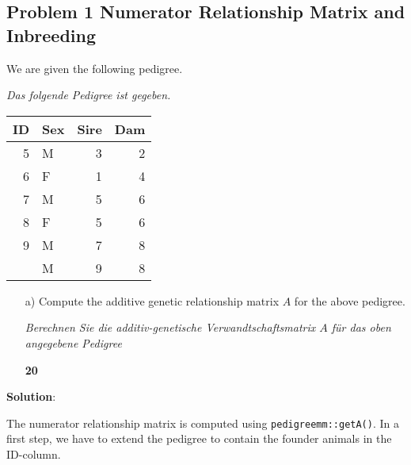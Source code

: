 \documentclass[
]{article}
\newcommand{\points}[1]
{\begin{flushright}\textbf{#1}\end{flushright}}
\newcommand{\solstart}
{\vspace{3ex}\textbf{Solution}:}
\begin{document}
\clearpage
\pagebreak

\hypertarget{problem-1-numerator-relationship-matrix-and-inbreeding}{%
\subsection{Problem 1 Numerator Relationship Matrix and
Inbreeding}\label{problem-1-numerator-relationship-matrix-and-inbreeding}}

We are given the following pedigree.

\textit{Das folgende Pedigree ist gegeben.}

\begin{center}

\begin{tabular}{rlrr}
\toprule
ID & Sex & Sire & Dam\\
\midrule
5 & M & 3 & 2\\
6 & F & 1 & 4\\
7 & M & 5 & 6\\
8 & F & 5 & 6\\
9 & M & 7 & 8\\
\addlinespace
10 & M & 9 & 8\\
\bottomrule
\end{tabular}
\end{center}

\begin{enumerate}
\item[a)] Compute the additive genetic relationship matrix $A$ for the above pedigree.

\textit{Berechnen Sie die additiv-genetische Verwandtschaftsmatrix $A$ für das oben angegebene Pedigree}
\points{20}
\end{enumerate}

\solstart

The numerator relationship matrix is computed using
\texttt{pedigreemm::getA()}. In a first step, we have to extend the
pedigree to contain the founder animals in the ID-column.
\end{document}
